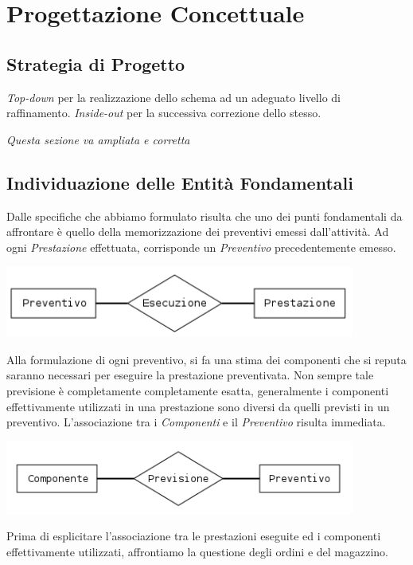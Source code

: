 \section{Progettazione Concettuale}
	
	\subsection{Strategia di Progetto}
		\emph{Top-down} per la realizzazione dello schema ad un adeguato livello di raffinamento. \emph{Inside-out} per la successiva correzione dello stesso.
		
		\emph{Questa sezione va ampliata e corretta}
		
	\subsection{Individuazione delle Entità Fondamentali}
		
		Dalle specifiche che abbiamo formulato risulta che uno dei punti fondamentali da affrontare è quello della memorizzazione dei preventivi emessi dall'attività.
		Ad ogni \emph{Prestazione} effettuata, corrisponde un \emph{Preventivo} precedentemente emesso.
		
		\includegraphics[width=11.5cm]{images/diagrams/preventivo_prestazione.png}
		
		Alla formulazione di ogni preventivo, si fa una stima dei componenti che si reputa saranno necessari per eseguire la prestazione preventivata. Non sempre tale previsione è completamente completamente esatta, generalmente i componenti effettivamente utilizzati in una prestazione sono diversi da quelli previsti in un preventivo.
		L'associazione tra i \emph{Componenti} e il \emph{Preventivo} risulta immediata.
		
		\includegraphics[width=11.5cm]{images/diagrams/preventivo_componente.png}
		
		Prima di esplicitare l'associazione tra le prestazioni eseguite ed i componenti effettivamente utilizzati, affrontiamo la questione degli ordini e del magazzino.
		
